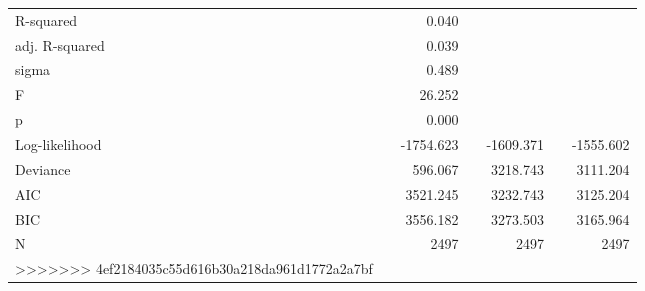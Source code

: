 \begin{tabular}{lcD{.}{.}{7}cD{.}{.}{7}cD{.}{.}{7}}
\midrule
R-squared                                               &  &      0.040   &&              &&             \\
adj. R-squared                                          &  &      0.039   &&              &&             \\
sigma                                                   &  &      0.489   &&              &&             \\
F                                                       &  &     26.252   &&              &&             \\
p                                                       &  &      0.000   &&              &&             \\
Log-likelihood                                          &  &  -1754.623   &&  -1609.371   &&  -1555.602  \\
Deviance                                                &  &    596.067   &&   3218.743   &&   3111.204  \\
AIC                                                     &  &   3521.245   &&   3232.743   &&   3125.204  \\
BIC                                                     &  &   3556.182   &&   3273.503   &&   3165.964  \\
N                                                       &  &   2497       &&   2497       &&   2497      \\
>>>>>>> 4ef2184035c55d616b30a218da961d1772a2a7bf
\bottomrule
\end{tabular}

